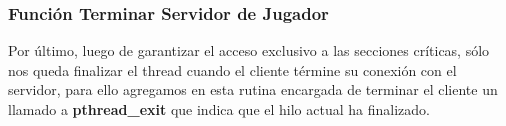 \subsubsection{Función Terminar Servidor de Jugador}

Por último, luego de garantizar el acceso exclusivo a las secciones críticas, sólo nos queda finalizar el thread cuando el cliente términe su conexión con el servidor, para ello agregamos en esta rutina encargada de terminar el cliente un llamado a \textbf{pthread\_exit} que indica que el hilo actual ha finalizado.
